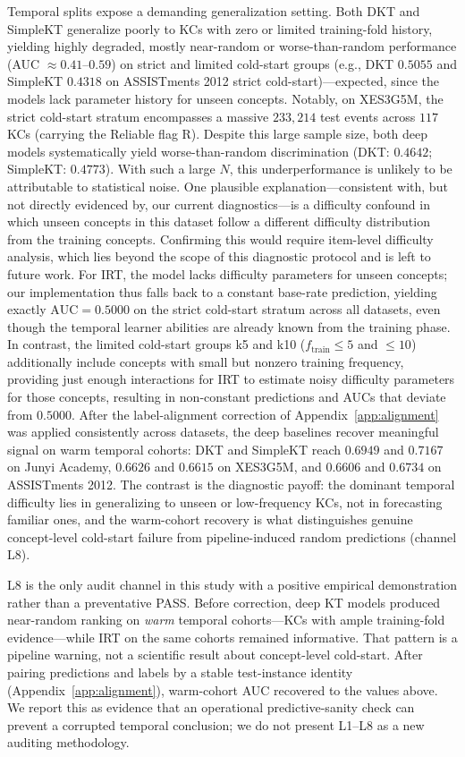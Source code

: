 Temporal splits expose a demanding generalization setting. Both DKT and SimpleKT generalize poorly to KCs with zero or limited training-fold history, yielding highly degraded, mostly near-random or worse-than-random performance (AUC $\approx 0.41$--$0.59$) on strict and limited cold-start groups (e.g., DKT $0.5055$ and SimpleKT $0.4318$ on ASSISTments 2012 strict cold-start)---expected, since the models lack parameter history for unseen concepts. Notably, on XES3G5M, the strict cold-start stratum encompasses a massive $233,214$ test events across $117$ KCs (carrying the Reliable flag R). Despite this large sample size, both deep models systematically yield worse-than-random discrimination (DKT: $0.4642$; SimpleKT: $0.4773$). With such a large $N$, this underperformance is unlikely to be attributable to statistical noise. One plausible explanation---consistent with, but not directly evidenced by, our current diagnostics---is a difficulty confound in which unseen concepts in this dataset follow a different difficulty distribution from the training concepts. Confirming this would require item-level difficulty analysis, which lies beyond the scope of this diagnostic protocol and is left to future work. For IRT, the model lacks difficulty parameters for unseen concepts; our implementation thus falls back to a constant base-rate prediction, yielding exactly $\text{AUC} = 0.5000$ on the strict cold-start stratum across all datasets, even though the temporal learner abilities are already known from the training phase. In contrast, the limited cold-start groups k5 and k10 ($f_{\mathrm{train}} \le 5$ and $\le 10$) additionally include concepts with small but nonzero training frequency, providing just enough interactions for IRT to estimate noisy difficulty parameters for those concepts, resulting in non-constant predictions and AUCs that deviate from $0.5000$. After the label-alignment correction of Appendix~\ref{app:alignment} was applied consistently across datasets, the deep baselines recover meaningful signal on warm temporal cohorts: DKT and SimpleKT reach $0.6949$ and $0.7167$ on Junyi Academy, $0.6626$ and $0.6615$ on XES3G5M, and $0.6606$ and $0.6734$ on ASSISTments 2012. The contrast is the diagnostic payoff: the dominant temporal difficulty lies in generalizing to unseen or low-frequency KCs, not in forecasting familiar ones, and the warm-cohort recovery is what distinguishes genuine concept-level cold-start failure from pipeline-induced random predictions (channel L8).

L8 is the only audit channel in this study with a positive empirical demonstration rather than a preventative PASS.
Before correction, deep KT models produced near-random ranking on \emph{warm} temporal cohorts---KCs with ample training-fold evidence---while IRT on the same cohorts remained informative.
That pattern is a pipeline warning, not a scientific result about concept-level cold-start.
After pairing predictions and labels by a stable test-instance identity (Appendix~\ref{app:alignment}), warm-cohort AUC recovered to the values above.
We report this as evidence that an operational predictive-sanity check can prevent a corrupted temporal conclusion; we do not present L1--L8 as a new auditing methodology.

